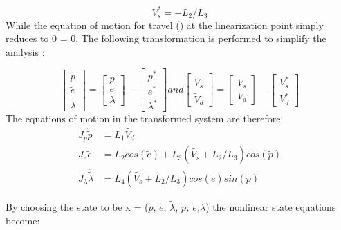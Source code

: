 \begin{equation}
\label{eq:V^*_s value}
  V^{*}_{s} = -L_{2} / L_{3}
\end{equation}
While the equation of motion for travel () at the linearization point simply reduces to 0 = 0.
The following transformation is performed to simplify the analysis
\cite[p.14]{assignment}:

\begin{equation}
\label{eq:transformation}
  \begin{bmatrix}
    \tilde{p} \\
    \tilde{e} \\
    \tilde{\lambda}
  \end{bmatrix}
  =
  \begin{bmatrix}
    p \\
    e \\
    \lambda
  \end{bmatrix}
  -
  \begin{bmatrix}
    p^{*} \\
    e^{*} \\
    \lambda^{*}
  \end{bmatrix}
  and
  \begin{bmatrix}
    \tilde{V}_{s} \\
    \tilde{V}_{d}
  \end{bmatrix}
  =
  \begin{bmatrix}
    V_{s} \\
    V_{d}
  \end{bmatrix}
  -
  \begin{bmatrix}
    V^{*}_{s} \\
    V^{*}_{d}
  \end{bmatrix}
\end{equation}
The equations of motion in the transformed system are therefore:
\begin{subequations}
  \begin{align}
    J_p\ddot{\tilde{p}} &= L_1\tilde{V_d} \label{eq:transformed pitch EoM}\\
    J_e\ddot{\tilde{e}} &= L_2cos(\tilde{e}) + L_3(\tilde{V_s}+L_2/L_3)cos(\tilde{p}) \label{eq:transformed elevation EoM}\\
    J_{\lambda}\ddot{\tilde{\lambda}} &= L_4(\tilde{V_s}+L_2/L_3)cos(\tilde{e})sin(\tilde{p}) \label{eq:transformed travel EoM}
  \end{align}
\end{subequations}

By choosing the state to be x = ($\tilde{p}$, $\tilde{e}$,
$\tilde{\lambda}$, \textit{$\dot{p}$, $\dot{e}$,$\dot{\lambda}$}) the
nonlinear state equations become:

